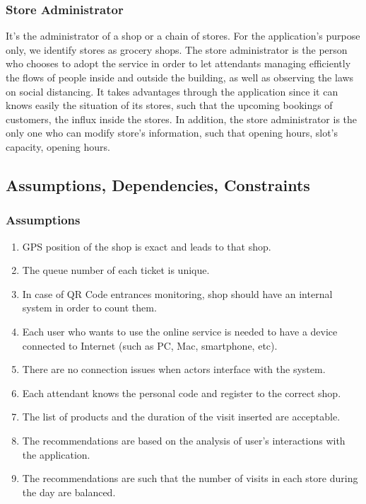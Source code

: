 \documentclass[table, 12pt]{article}
\begin{document}
\subsubsection{Store Administrator}
It's the administrator of a shop or a chain of stores. For the application's purpose only, we identify stores as grocery shops. The store administrator is the person who chooses to adopt the service in order to let attendants managing efficiently the flows of people inside and outside the building, as well as observing the laws on social distancing. It takes advantages through the application since it can knows easily the situation of its stores, such that the upcoming bookings of customers, the influx inside the stores. In addition, the store administrator is the only one who can modify store's information, such that opening hours, slot's capacity, opening hours.

\subsection{Assumptions, Dependencies, Constraints}
\subsubsection{Assumptions}
\begin{enumerate}[label=\textbf{D\arabic*}:]
    \item GPS position of the shop is exact and leads to that shop.
    \item The queue number of each ticket is unique.
    \item In case of QR Code entrances monitoring, shop should have an internal system in order to count them.
    \item Each user who wants to use the online service is needed to have a device connected to Internet (such as PC, Mac, smartphone, etc).
    \item There are no connection issues when actors interface with the system.
    \item Each attendant knows the personal code and register to the correct shop.
    \item The list of products and the duration of the visit inserted are acceptable.
    \item The recommendations are based on the analysis of user's interactions with the application.
    \item The recommendations are such that the number of visits in each store during the day are balanced.
\end{enumerate}
\end{document}
